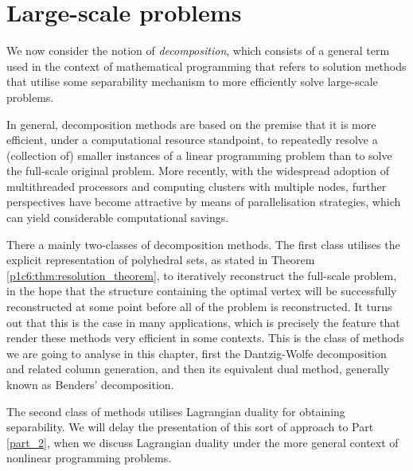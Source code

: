 \section{Large-scale problems} \label{section_71}

We now consider the notion of \emph{decomposition}, which consists of a general term used in the context of mathematical programming that refers to solution methods that utilise some separability mechanism to more efficiently solve large-scale problems.

In general, decomposition methods are based on the premise that it is more efficient, under a computational resource standpoint, to repeatedly resolve a (collection of) smaller instances of a linear programming problem than to solve the full-scale original problem. More recently, with the widespread adoption of multithreaded processors and computing clusters with multiple nodes, further perspectives have become attractive by means of parallelisation strategies, which can yield considerable computational savings. 

There a mainly two-classes of decomposition methods. The first class utilises the  explicit representation of polyhedral sets, as stated in Theorem \ref{p1c6:thm:resolution_theorem}, to iteratively reconstruct the full-scale problem, in the hope that the structure containing the optimal vertex will be successfully reconstructed at some point before all of the problem is reconstructed. It turns out that this is the case in many applications, which is precisely the feature that render these methods very efficient in some contexts. This is the class of methods we are going to analyse in this chapter, first the Dantzig-Wolfe decomposition and related column generation, and then its equivalent dual method, generally known as Benders' decomposition.


The second class of methods utilises Lagrangian duality for obtaining separability. We will delay the presentation of this sort of approach to Part \ref{part_2}, when we discuss Lagrangian duality under the more general context of nonlinear programming problems.


